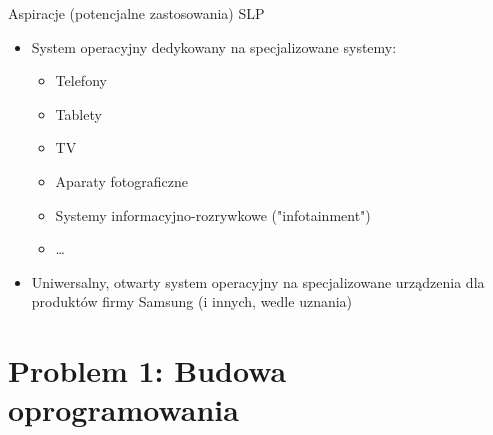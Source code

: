 \documentclass[presentation,aspectratio=43,12pt]{beamer}
\begin{document}
\begin{frame}[label=sec-2-7]{Aspiracje (potencjalne zastosowania) SLP}
\begin{itemize}
\item System operacyjny dedykowany na specjalizowane systemy:
\begin{itemize}
\item Telefony
\item Tablety
\item TV
\item Aparaty fotograficzne
\item Systemy informacyjno-rozrywkowe ("infotainment")
\item \ldots{}
\end{itemize}
\pause

\item Uniwersalny, otwarty system operacyjny na specjalizowane
urządzenia dla produktów firmy Samsung (i innych, wedle uznania)
\end{itemize}

\end{frame}

\section{Problem 1: Budowa oprogramowania}
\label{sec-3}
\end{document}

